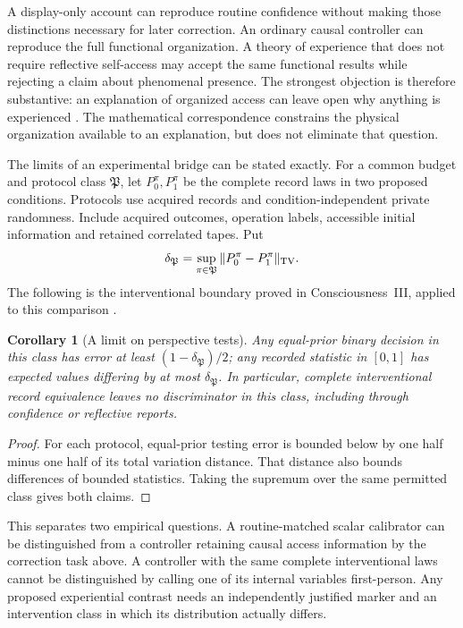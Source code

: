 \documentclass[12pt]{article}
\newtheorem{corollary}[theorem]{Corollary}
\theoremstyle{definition}
\theoremstyle{remark}
\begin{document}
A display-only account can reproduce routine confidence without making
those distinctions necessary for later correction. An ordinary causal
controller can reproduce the full functional organization. A theory
of experience that does not require reflective self-access may accept
the same functional results while rejecting a claim about phenomenal
presence. The strongest objection is therefore substantive: an
explanation of organized access can leave open why anything is
experienced \cite{Chalmers}. The mathematical correspondence constrains
the physical organization available to an explanation, but does not
eliminate that question.

The limits of an experimental bridge can be stated exactly. For a
common budget and protocol class \(\mathfrak P\), let
\(P_0^\pi,P_1^\pi\) be the complete record laws in two proposed
conditions. Protocols use acquired records and condition-independent
private randomness. Include acquired outcomes, operation labels, accessible
initial information and retained correlated tapes. Put
\[
 \delta_{\mathfrak P}=\sup_{\pi\in\mathfrak P}
                   \|P_0^\pi-P_1^\pi\|_{\rm TV}.
\]
The following is the interventional boundary proved in
Consciousness~III, applied to this comparison \cite{PaperCIII}.

\begin{corollary}[A limit on perspective tests]
\label{cor:perspective-tests}
Any equal-prior binary decision in this class has error at least
\((1-\delta_{\mathfrak P})/2\); any recorded statistic in \([0,1]\)
has expected values differing by at most \(\delta_{\mathfrak P}\).
In particular, complete interventional record equivalence leaves
no discriminator in this class, including through confidence or
reflective reports.
\end{corollary}
\begin{proof}
For each protocol, equal-prior testing error is bounded below by
one half minus one half of its total variation distance. That
distance also bounds differences of bounded statistics.
Taking the supremum over the same permitted class gives both
claims.
\end{proof}

This separates two empirical questions. A routine-matched scalar
calibrator can be distinguished from a controller retaining causal
access information by the correction task above. A controller with
the same complete interventional laws cannot be distinguished by
calling one of its internal variables first-person. Any proposed
experiential contrast needs an independently justified marker and
an intervention class in which its distribution actually differs.
\end{document}
